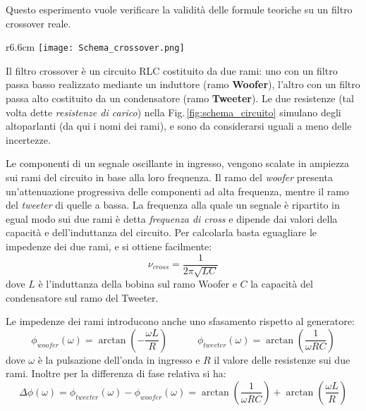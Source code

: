 \documentclass[../Relazione_circuiti]{subfiles}
\begin{document}
Questo esperimento vuole verificare la validità delle formule teoriche su un filtro crossover reale.

\begin{wrapfigure}{r}{6.6cm}
  \centering
  \texttt{[image: Schema\_crossover.png]}
  \caption{Schema del circuito realizzato}
  \label{fig:schema_circuito}
\end{wrapfigure}

Il filtro crossover è un circuito RLC costituito da due rami: uno con un filtro passa basso realizzato mediante un
induttore (ramo \textbf{Woofer}), l'altro con un filtro passa alto costituito da un condensatore (ramo
\textbf{Tweeter}).
Le due resistenze (tal volta dette \textit{resistenze di carico}) nella Fig.\,\ref{fig:schema_circuito} simulano degli
altoparlanti (da qui i nomi dei rami), e sono da considerarsi uguali a meno delle incertezze.

Le componenti di un segnale oscillante in ingresso, vengono scalate in ampiezza sui rami del circuito in base alla loro
frequenza.
Il ramo del \textit{woofer} presenta un'attenuazione progressiva delle componenti ad alta frequenza, mentre il ramo
del \textit{tweeter} di quelle a bassa.
La frequenza alla quale un segnale è ripartito in egual modo sui due rami è detta \textit{frequenza di cross} e dipende
dai valori della capacità e dell'induttanza del circuito.
Per calcolarla basta eguagliare le impedenze dei due rami, e si ottiene facilmente:
\begin{equation}
  \label{eq:f_cross}
  \nu_{cross} = \frac{1}{2 \pi \sqrt{LC} }
\end{equation}
dove $L$ è l'induttanza della bobina sul ramo Woofer e $C$ la capacità del condensatore sul ramo del Tweeter.

Le impedenze dei rami introducono anche uno sfasamento rispetto al generatore:
\begin{equation}
\label{eq: p_w_t}
  \phi_{woofer}(\omega) = \arctan(-\frac{\omega L}{R}) \qquad \quad %
  \phi_{tweeter}(\omega) = \arctan(\frac{1}{\omega RC}) %
\end{equation}
dove $\omega$ è la pulsazione dell'onda in ingresso e $R$ il valore delle resistenze sui due rami.
Inoltre per la differenza di fase relativa si ha:
\begin{equation}
  \label{eq:p_diff}
  \Delta \phi(\omega) = \phi_{tweeter}(\omega) - \phi_{woofer}(\omega) = \arctan(\frac{1}{\omega RC}) + \arctan(\frac{\omega L}{R})
\end{equation}
\end{document}
